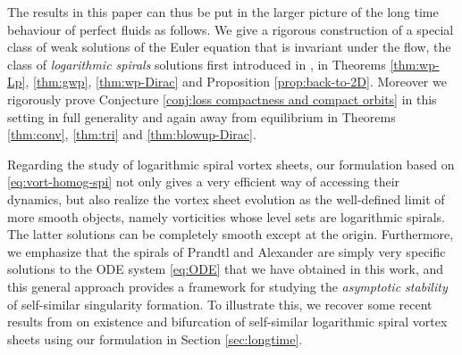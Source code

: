 \documentclass[10pt]{article}
\theoremstyle{definition}
\theoremstyle{remark}
\numberwithin{equation}{section}
\newcommand{\0}{\emptyset}
\begin{document}
 \medskip 
	
	\noindent The results in this paper can thus be put in the larger picture of the long time behaviour of perfect fluids as follows. We give a rigorous construction of a special class of weak solutions of the Euler equation that is invariant under the flow, the class of \textit{logarithmic spirals} solutions first introduced in \cite{EJSVP1}, in Theorems \ref{thm:wp-Lp}, \ref{thm:gwp}, \ref{thm:wp-Dirac} and Proposition \ref{prop:back-to-2D}. Moreover we rigorously prove Conjecture \ref{conj:loss compactness and compact orbits} in this setting in full generality and again away from equilibrium in Theorems \ref{thm:conv}, \ref{thm:tri} and \ref{thm:blowup-Dirac}.
	
    \medskip 
	

    \noindent Regarding the study of logarithmic spiral vortex sheets, our formulation based on \eqref{eq:vort-homog-spi} not only gives a very efficient way of accessing their dynamics, but also realize the vortex sheet evolution as the well-defined limit of more smooth objects, namely vorticities whose level sets are logarithmic spirals. The latter solutions can be completely smooth except at the origin. Furthermore, we emphasize that the spirals of Prandtl and Alexander are simply very specific solutions to the ODE system \eqref{eq:ODE} that we have obtained in this work, and this general approach provides a framework for studying the \textit{asymptotic stability} of self-similar singularity formation. To illustrate this, we recover some recent results from \cite{Elling-Gnann,CKW21,CKW22} on existence and bifurcation of self-similar logarithmic spiral vortex sheets using our formulation in Section \ref{sec:longtime}. 
    
	
    \medskip 
	
\end{document}
